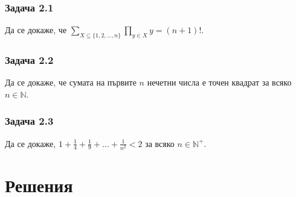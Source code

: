 \documentclass[12pt]{article}
\begin{document}
\subsubsection*{Задача 2.1}
Да се докаже, че $\displaystyle\sum_{X \subseteq \{ 1, 2, ..., n \}} \prod_{y \in X} y = (n+1)!$.
\subsubsection*{Задача 2.2}
Да се докаже, че сумата на първите $n$ нечетни числа е точен квадрат за всяко $n \in \mathbb{N}$.
\subsubsection*{Задача 2.3}
Да се докаже, $1 + \frac{1}{4} + \frac{1}{9} + ... + \frac{1}{n^2} < 2$ за всяко $n \in \mathbb{N}^+$.


\section*{Решения}
\end{document}
